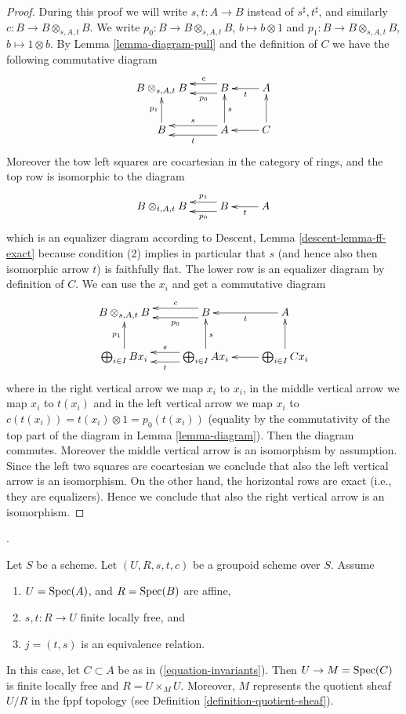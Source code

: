 \begin{proof}
During this proof we will write $s, t : A \to B$ instead of
$s^\sharp, t^\sharp$, and similarly $c : B \to B \otimes_{s, A, t} B$.
We write $p_0 : B \to B \otimes_{s, A, t} B$, $b \mapsto b \otimes 1$ and
$p_1 : B \to B \otimes_{s, A, t} B$, $b \mapsto 1 \otimes b$. By
Lemma \ref{lemma-diagram-pull}
and the definition of $C$ we have the following
commutative diagram
$$
\xymatrix{
B \otimes_{s, A, t} B &
B \ar@<-1ex>[l]_-c \ar@<1ex>[l]^-{p_0} &
A \ar[l]^t \\
B \ar[u]^{p_1} &
A \ar@<-1ex>[l]_s \ar@<1ex>[l]^t \ar[u]_s &
C \ar[u] \ar[l]
}
$$
Moreover the tow left squares are cocartesian in the category of rings, and
the top row is isomorphic to the diagram
$$
\xymatrix{
B \otimes_{t, A, t} B &
B \ar@<-1ex>[l]_-{p_1} \ar@<1ex>[l]^-{p_0} &
A \ar[l]^t
}
$$
which is an equalizer diagram according to
Descent, Lemma \ref{descent-lemma-ff-exact} because condition (2) implies
in particular that $s$ (and hence also then isomorphic arrow $t$)
is faithfully flat.
The lower row is an equalizer diagram by definition of $C$.
We can use the $x_i$ and get a commutative diagram
$$
\xymatrix{
B \otimes_{s, A, t} B &
B \ar@<-1ex>[l]_-c \ar@<1ex>[l]^-{p_0} &
A \ar[l]^t \\
\bigoplus_{i \in I} B x_i \ar[u]^{p_1} &
\bigoplus_{i \in I} A x_i \ar@<-1ex>[l]_s \ar@<1ex>[l]^t \ar[u]_s &
\bigoplus_{i \in I} C x_i \ar[u] \ar[l]
}
$$
where in the right vertical arrow we map $x_i$ to $x_i$,
in the middle vertical arrow we map $x_i$ to $t(x_i)$ and
in the left vertical arrow we map $x_i$ to
$c(t(x_i)) = t(x_i) \otimes 1 = p_0(t(x_i))$ (equality by the commutativity
of the top part of the diagram in Lemma \ref{lemma-diagram}). Then the diagram
commutes. Moreover the middle vertical arrow is an isomorphism
by assumption. Since the left two squares are cocartesian we
conclude that also the left vertical arrow is an isomorphism.
On the other hand, the horizontal rows are exact (i.e., they are
equalizers). Hence we conclude that also the right vertical arrow
is an isomorphism.
\end{proof}

\begin{proposition}
\label{proposition-finite-flat-equivalence}
\begin{reference}
\cite[Expos\'e 212, Th\'eor\`eme 5.1 (iv), p. 111]{FGA}.
\end{reference}
Let $S$ be a scheme.
Let $(U, R, s, t, c)$ be a groupoid scheme over $S$.
Assume
\begin{enumerate}
\item $U = \mathop{\mathrm{Spec}}(A)$, and $R = \mathop{\mathrm{Spec}}(B)$ are affine,
\item $s, t : R \to U$ finite locally free, and
\item $j = (t, s)$ is an equivalence relation.
\end{enumerate}
In this case, let $C \subset A$ be as in
(\ref{equation-invariants}). Then $U \to M = \mathop{\mathrm{Spec}}(C)$
is finite locally free and $R = U \times_M U$.
Moreover, $M$ represents the quotient sheaf $U/R$
in the fppf topology (see Definition \ref{definition-quotient-sheaf}).
\end{proposition}

